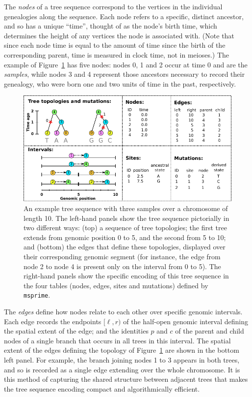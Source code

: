 \documentclass{article}
\newcommand{\msprime}{\texttt{msprime}}
\begin{document}
The \emph{nodes} of a tree sequence
correspond to the vertices in the individual genealogies along the sequence.
Each node refers to a specific, distinct ancestor,
and so has a unique ``time'',
thought of as the node's birth time, which determines the height of any vertices
the node is associated with.
(Note that since each node time is equal to the amount of time since the {birth} of the
corresponding parent, time is measured in clock time, not in meioses.)
The example of Figure~\ref{fig:example_tree_sequence} has five nodes:
nodes 0, 1 and 2 occur at time 0 and are the \emph{samples},
while nodes 3 and 4 represent those ancestors necessary to record their genealogy,
who were born one and two units of time in the past, respectively.

\begin{figure}
    \begin{center}
        \includegraphics[width=\textwidth]{example_tree_sequence}
    \end{center}
    \caption{
        An example tree sequence with three samples over a chromosome of length 10.
        The left-hand panels show the tree sequence pictorially in two different ways:
        (top) a sequence of tree topologies; the first tree extends from genomic position 0 to 5,
        and the second from 5 to 10; and
        (bottom) the edges that define these topologies,
        displayed over their corresponding genomic segment
        (for instance, the edge from node 2 to node 4 is present only on the interval from 0 to 5).
        The right-hand panels show the specific encoding
        of this tree sequence in the four tables (nodes, edges, sites and mutations)
        defined by \msprime.
        \label{fig:example_tree_sequence}
    }
\end{figure}

The \emph{edges} define how nodes relate to each other over specific genomic intervals.
Each edge records
the endpoints $[\ell, r)$ of the half-open genomic interval defining the
spatial extent of the edge;
and the identities $p$ and $c$ of the parent and child nodes
of a single branch that occurs in all trees in this interval.
The spatial extent of the edges defining the topology of Figure~\ref{fig:example_tree_sequence}
are shown in the bottom left panel.
For example, the branch joining nodes 1 to 3 appears in both trees,
and so is recorded as a single edge extending over the whole chromosome.
It is this method of capturing the shared structure between adjacent trees that makes the
tree sequence encoding compact and algorithmically efficient.
\end{document}
